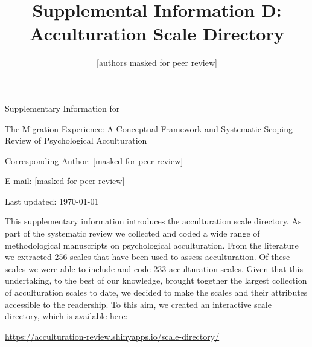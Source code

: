 \documentclass[man, 12pt, a4paper]{apa7}
\title{Supplemental Information D: Acculturation Scale Directory}
\author{[authors masked for peer review]}
\begin{document}
\begin{titlepage}
	{\noindent\Large Supplementary Information for \par}
	\vspace{0.5cm}
	{\noindent\Large The Migration Experience: A Conceptual Framework and Systematic Scoping Review of Psychological Acculturation\par}
	\vspace{1.5cm}
	{\noindent\LARGE\bfseries \thetitle \par}
	\vspace{2cm}
	{\noindent\Large\itshape \theauthor \par}
	\vfill
	\noindent Corresponding Author: [masked for peer review]\par
	\noindent E-mail: [masked for peer review]\par
	\vfill

	{\noindent Last updated: \today\par}
\end{titlepage}

\begin{center}
   \textbf{\thetitle} 
\end{center}

This supplementary information introduces the acculturation scale directory. As part of the systematic review we collected and coded a wide range of methodological manuscripts on psychological acculturation. From the literature we extracted 256 scales that have been used to assess acculturation. Of these scales we were able to include and code 233 acculturation scales. Given that this undertaking, to the best of our knowledge, brought together the largest collection of acculturation scales to date, we decided to make the scales and their attributes accessible to the readership. To this aim, we created an interactive scale directory, which is available here:

\vspace{.5cm}
\begin{tcolorbox}
    \vspace{0.2cm} \centering 
    \href{https://acculturation-review.shinyapps.io/scale-directory/}{https://acculturation-review.shinyapps.io/scale-directory/}
    \vspace{0.2cm} 
\end{tcolorbox}
\end{document}

